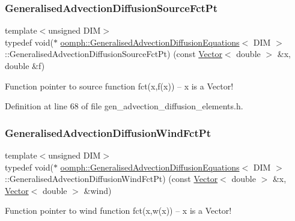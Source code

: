 \subsubsection{\texorpdfstring{Generalised\+Advection\+Diffusion\+Source\+Fct\+Pt}{GeneralisedAdvectionDiffusionSourceFctPt}}
{\footnotesize\ttfamily template$<$unsigned D\+IM$>$ \\
typedef void($\ast$ \hyperlink{classoomph_1_1GeneralisedAdvectionDiffusionEquations}{oomph\+::\+Generalised\+Advection\+Diffusion\+Equations}$<$ D\+IM $>$\+::Generalised\+Advection\+Diffusion\+Source\+Fct\+Pt) (const \hyperlink{classoomph_1_1Vector}{Vector}$<$ double $>$ \&x, double \&f)}



Function pointer to source function fct(x,f(x)) -- x is a Vector! 



Definition at line 68 of file gen\+\_\+advection\+\_\+diffusion\+\_\+elements.\+h.

\mbox{\label{classoomph_1_1GeneralisedAdvectionDiffusionEquations_ac5a63eb03aee5957e7b14a4578423cfc}} 
\subsubsection{\texorpdfstring{Generalised\+Advection\+Diffusion\+Wind\+Fct\+Pt}{GeneralisedAdvectionDiffusionWindFctPt}}
{\footnotesize\ttfamily template$<$unsigned D\+IM$>$ \\
typedef void($\ast$ \hyperlink{classoomph_1_1GeneralisedAdvectionDiffusionEquations}{oomph\+::\+Generalised\+Advection\+Diffusion\+Equations}$<$ D\+IM $>$\+::Generalised\+Advection\+Diffusion\+Wind\+Fct\+Pt) (const \hyperlink{classoomph_1_1Vector}{Vector}$<$ double $>$ \&x, \hyperlink{classoomph_1_1Vector}{Vector}$<$ double $>$ \&wind)}



Function pointer to wind function fct(x,w(x)) -- x is a Vector! 



